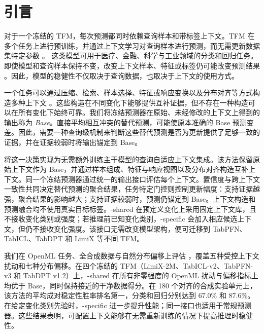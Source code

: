 \section{引言}
\label{sec:introduction}

对于一个冻结的 TFM，每次预测都同时依赖查询样本和带标签上下文。TFM 在多个任务上进行预训练，并通过上下文学习对查询样本进行预测，而无需更新数据集特定参数
\citep{muller2023tabpfn,hollmann2025tabpfn,qu2025tabicl,ma2025tabdpt}。
这类模型可用于医疗、金融、科学与工业领域的分类和回归任务。即使模型和查询样本保持不变，改变上下文样本、特征或标签仍可能改变预测结果 \citep{abdullah2026contextsampling}。因此，模型的稳健性不仅取决于查询数据，也取决于上下文的使用方式。

一个任务可以通过压缩、检索、样本选择、特征或响应变换以及分布对齐等方式构造多种上下文
\citep{feuer2024tunetables,thomas2024localpfn,xu2025mixturepfn,
treerath2026tabaicl,hollmann2025tabpfn,khalifa2023dense}。这些构造在不同变化下能够提供互补证据，但不存在一种构造可以在所有变化下始终可靠。我们将冻结预测器在原始、未经修改的上下文上得到的输出称为 \emph{Base}。直接平均相互冲突的替代预测，可能使原本准确的 Base 预测变差。因此，需要一种查询级机制来判断这些替代预测是否为更新提供了足够一致的证据，并在证据较弱时将输出锚定到 Base。

\textbf{\method{}} 将这一决策实现为无需额外训练主干模型的查询自适应上下文集成。该方法保留原始上下文作为 Base，并通过样本组成、特征与响应视图以及分布对齐构造互补上下文。同一个冻结预测器通过统一的输出接口评估每个上下文。置信度与跨上下文一致性共同决定替代预测的聚合结果，任务特定门控则控制更新幅度：支持证据越强，聚合结果的影响越大；支持证据较弱时，预测仍锚定到 Base。上下文构造和预测融合均不使用真实目标标签。\method{}-shared 在预定义变化上采用固定上下文库，且不接收变化类别或强度；若推理前已知变化类别，\method{}-specific 会加入相应候选上下文，但仍不接收变化强度。该接口无需改变模型架构，便可迁移到 TabPFN、TabICL、TabDPT 和 LimiX 等不同 TFM。

我们在 OpenML 任务、全合成数据与自然分布偏移上评估 \method{}，覆盖五种受控上下文扰动和七种分布偏移。在四个冻结的 TFM（LimiX-2M、TabICL-v2、TabPFN-v3 和 TabDPT v1.2）上，\method{}-shared 在所有非零强度的 OpenML 扰动与偏移指标上均优于 Base，同时保持接近的干净数据得分。在 180 个对齐的合成实验单元上，该方法的平均成对稳定性胜率排名第一，分类和回归分别达到 $67.0\%$ 和 $87.6\%$。在给定变化类别先验时，\method{}-specific 进一步提升性能；同一接口也适用于常规预测器。这些结果表明，可配置上下文能够在无需重新训练的情况下提高推理时稳健性。
\FloatBarrier
